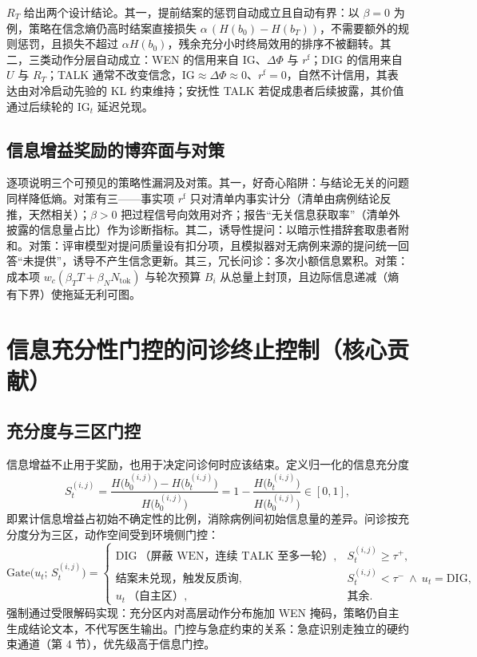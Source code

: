 \documentclass[11pt,a4paper]{ctexart}
\newcommand{\1}[1]{\mathbb{1}\!\left[#1\right]}
\newcommand{\IG}{\mathrm{IG}}
\begin{document}
$R_T$ 给出两个设计结论。其一，提前结案的惩罚自动成立且自动有界：以 $\beta=0$ 为例，策略在信念熵仍高时结案直接损失 $\alpha\,(H(b_0)-H(b_T))$，不需要额外的规则惩罚，且损失不超过 $\alpha H(b_0)$，残余充分小时终局效用的排序不被翻转。其二，三类动作分层自动成立：WEN 的信用来自 $\IG$、$\Delta\Phi$ 与 $r^{\mathrm{f}}$；DIG 的信用来自 $U$ 与 $R_T$；TALK 通常不改变信念，$\IG\approx\Delta\Phi\approx0$、$r^{\mathrm{f}}=0$，自然不计信用，其表达由对冷启动先验的 KL 约束维持；安抚性 TALK 若促成患者后续披露，其价值通过后续轮的 $\IG_t$ 延迟兑现。

\subsection{信息增益奖励的博弈面与对策}
逐项说明三个可预见的策略性漏洞及对策。其一，好奇心陷阱：与结论无关的问题同样降低熵。对策有三——事实项 $r^{\mathrm{f}}$ 只对清单内事实计分（清单由病例结论反推，天然相关）；$\beta>0$ 把过程信号向效用对齐；报告``无关信息获取率''（清单外披露的信息量占比）作为诊断指标。其二，诱导性提问：以暗示性措辞套取患者附和。对策：评审模型对提问质量设有扣分项，且模拟器对无病例来源的提问统一回答``未提供''，诱导不产生信念更新。其三，冗长问诊：多次小额信息累积。对策：成本项 $w_c(\beta_T T+\beta_N N_{\mathrm{tok}})$ 与轮次预算 $B_i$ 从总量上封顶，且边际信息递减（熵有下界）使拖延无利可图。

\section{信息充分性门控的问诊终止控制（核心贡献）}\label{sec:gate}

\subsection{充分度与三区门控}
信息增益不止用于奖励，也用于决定问诊何时应该结束。定义归一化的信息充分度
\begin{equation}\label{eq:suff}
S_t^{(i,j)}
=\frac{H\bigl(b_0^{(i,j)}\bigr)-H\bigl(b_t^{(i,j)}\bigr)}{H\bigl(b_0^{(i,j)}\bigr)}
=1-\frac{H\bigl(b_t^{(i,j)}\bigr)}{H\bigl(b_0^{(i,j)}\bigr)}\in[0,1],
\end{equation}
即累计信息增益占初始不确定性的比例，消除病例间初始信息量的差异。问诊按充分度分为三区，动作空间受到环境侧门控：
\begin{equation}\label{eq:gate-rule}
\mathrm{Gate}\bigl(u_t;\,S_t^{(i,j)}\bigr)=
\begin{cases}
\mathrm{DIG}\ \text{（屏蔽 WEN，连续 TALK 至多一轮）}, & S_t^{(i,j)}\ge\tau^+,\\[2pt]
\text{结案未兑现，触发反质询}, & S_t^{(i,j)}<\tau^-\ \wedge\ u_t=\mathrm{DIG},\\[2pt]
u_t\ \text{（自主区）}, & \text{其余}.
\end{cases}
\end{equation}
强制通过受限解码实现：充分区内对高层动作分布施加 WEN 掩码，策略仍自主生成结论文本，不代写医生输出。门控与急症约束的关系：急症识别走独立的硬约束通道（第 4 节），优先级高于信息门控。
\end{document}
